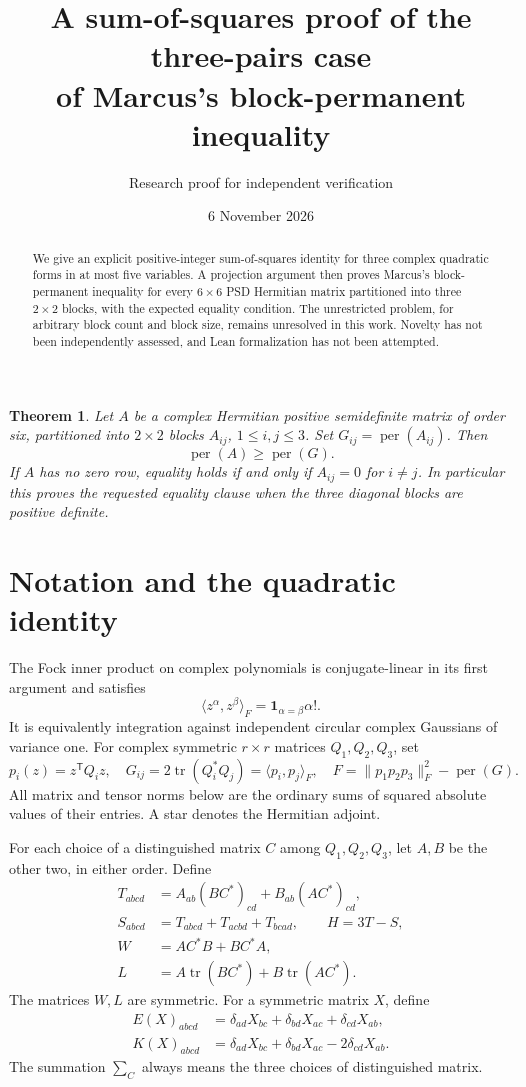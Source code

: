 \documentclass[11pt]{article}
\title{A sum-of-squares proof of the three-pairs case\\of Marcus's block-permanent inequality}
\author{Research proof for independent verification}
\date{6 November 2026}
\newcommand{\per}{\operatorname{per}}
\newcommand{\tr}{\operatorname{tr}}
\newtheorem{theorem}{Theorem}
\begin{document}
\maketitle
\begin{abstract}
We give an explicit positive-integer sum-of-squares identity for three complex
quadratic forms in at most five variables. A projection argument then proves
Marcus's block-permanent inequality for every $6\times6$ PSD Hermitian matrix
partitioned into three $2\times2$ blocks, with the expected equality condition.
The unrestricted problem, for arbitrary block count and block size, remains
unresolved in this work. Novelty has not been independently assessed, and
Lean formalization has not been attempted.
\end{abstract}

\begin{theorem}\label{main}
Let $A$ be a complex Hermitian positive semidefinite matrix of order six,
partitioned into $2\times2$ blocks $A_{ij}$, $1\leq i,j\leq3$. Set
$G_{ij}=\per(A_{ij})$. Then
\[
 \per(A)\geq\per(G).
\]
If $A$ has no zero row, equality holds if and only if $A_{ij}=0$ for $i\ne j$.
In particular this proves the requested equality clause when the three
diagonal blocks are positive definite.
\end{theorem}

\section{Notation and the quadratic identity}
The Fock inner product on complex polynomials is conjugate-linear in its first
argument and satisfies
\[
 \langle z^\alpha,z^\beta\rangle_F=\mathbf1_{\alpha=\beta}\alpha!.
\]
It is equivalently integration against independent circular complex Gaussians
of variance one. For complex symmetric $r\times r$ matrices $Q_1,Q_2,Q_3$, set
\[
 p_i(z)=z^{\mathsf T}Q_i z,\quad
 G_{ij}=2\tr(Q_i^*Q_j)=\langle p_i,p_j\rangle_F,\quad
 F=\|p_1p_2p_3\|_F^2-\per(G).
\]
All matrix and tensor norms below are the ordinary sums of squared absolute
values of their entries. A star denotes the Hermitian adjoint.

For each choice of a distinguished matrix $C$ among $Q_1,Q_2,Q_3$, let $A,B$
be the other two, in either order. Define
\begin{align*}
 T_{abcd}&=A_{ab}(BC^*)_{cd}+B_{ab}(AC^*)_{cd},\\
 S_{abcd}&=T_{abcd}+T_{acbd}+T_{bcad},\qquad H=3T-S,\\
 W&=AC^*B+BC^*A,\\
 L&=A\tr(BC^*)+B\tr(AC^*).
\end{align*}
The matrices $W,L$ are symmetric. For a symmetric matrix $X$, define
\begin{align*}
 E(X)_{abcd}&=\delta_{ad}X_{bc}+\delta_{bd}X_{ac}+\delta_{cd}X_{ab},\\
 K(X)_{abcd}&=\delta_{ad}X_{bc}+\delta_{bd}X_{ac}-2\delta_{cd}X_{ab}.
\end{align*}
The summation $\sum_C$ always means the three choices of distinguished matrix.
\end{document}
